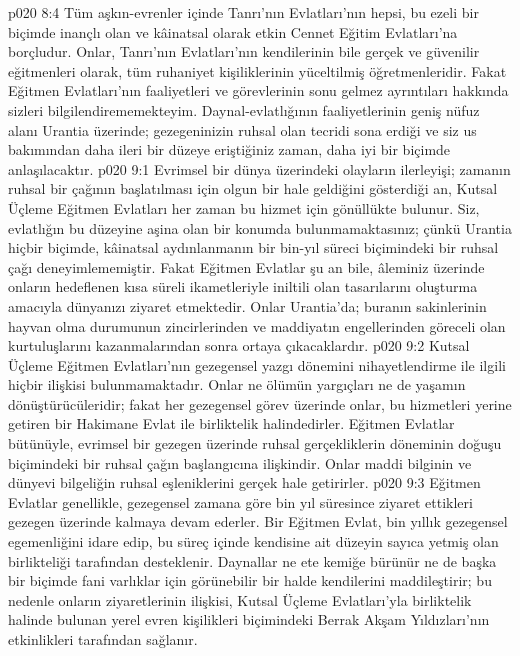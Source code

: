 \vs p020 8:4 Tüm aşkın\hyp{}evrenler içinde Tanrı’nın Evlatları’nın hepsi, bu ezeli bir biçimde inançlı olan ve kâinatsal olarak etkin Cennet Eğitim Evlatları’na borçludur. Onlar, Tanrı’nın Evlatları’nın kendilerinin bile gerçek ve güvenilir eğitmenleri olarak, tüm ruhaniyet kişiliklerinin yüceltilmiş öğretmenleridir. Fakat Eğitmen Evlatları’nın faaliyetleri ve görevlerinin sonu gelmez ayrıntıları hakkında sizleri bilgilendirememekteyim. Daynal\hyp{}evlatlığının faaliyetlerinin geniş nüfuz alanı Urantia üzerinde; gezegeninizin ruhsal olan tecridi sona erdiği ve siz us bakımından daha ileri bir düzeye eriştiğiniz zaman, daha iyi bir biçimde anlaşılacaktır.
\vs p020 9:1 Evrimsel bir dünya üzerindeki olayların ilerleyişi; zamanın ruhsal bir çağının başlatılması için olgun bir hale geldiğini gösterdiği an, Kutsal Üçleme Eğitmen Evlatları her zaman bu hizmet için gönüllükte bulunur. Siz, evlatlığın bu düzeyine aşina olan bir konumda bulunmamaktasınız; çünkü Urantia hiçbir biçimde, kâinatsal aydınlanmanın bir bin\hyp{}yıl süreci biçimindeki bir ruhsal çağı deneyimlememiştir. Fakat Eğitmen Evlatlar şu an bile, âleminiz üzerinde onların hedeflenen kısa süreli ikametleriyle iniltili olan tasarılarını oluşturma amacıyla dünyanızı ziyaret etmektedir. Onlar Urantia’da; buranın sakinlerinin hayvan olma durumunun zincirlerinden ve maddiyatın engellerinden göreceli olan kurtuluşlarını kazanmalarından sonra ortaya çıkacaklardır.
\vs p020 9:2 Kutsal Üçleme Eğitmen Evlatları’nın gezegensel yazgı dönemini nihayetlendirme ile ilgili hiçbir ilişkisi bulunmamaktadır. Onlar ne ölümün yargıçları ne de yaşamın dönüştürücüleridir; fakat her gezegensel görev üzerinde onlar, bu hizmetleri yerine getiren bir Hakimane Evlat ile birliktelik halindedirler. Eğitmen Evlatlar bütünüyle, evrimsel bir gezegen üzerinde ruhsal gerçekliklerin döneminin doğuşu biçimindeki bir ruhsal çağın başlangıcına ilişkindir. Onlar maddi bilginin ve dünyevi bilgeliğin ruhsal eşleniklerini gerçek hale getirirler.
\vs p020 9:3 Eğitmen Evlatlar genellikle, gezegensel zamana göre bin yıl süresince ziyaret ettikleri gezegen üzerinde kalmaya devam ederler. Bir Eğitmen Evlat, bin yıllık gezegensel egemenliğini idare edip, bu süreç içinde kendisine ait düzeyin sayıca yetmiş olan birlikteliği tarafından desteklenir. Daynallar ne ete kemiğe bürünür ne de başka bir biçimde fani varlıklar için görünebilir bir halde kendilerini maddileştirir; bu nedenle onların ziyaretlerinin ilişkisi, Kutsal Üçleme Evlatları’yla birliktelik halinde bulunan yerel evren kişilikleri biçimindeki Berrak Akşam Yıldızları’nın etkinlikleri tarafından sağlanır.
